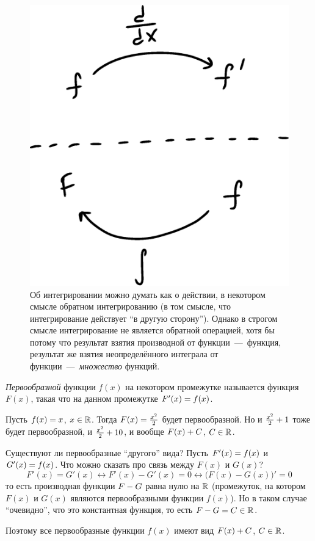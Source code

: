 \documentclass[a4paper,12pt]{article}
\begin{document}
  \begin{figure}[ht]
    \centering
    \includegraphics[width=0.5\linewidth]{images/Diff-Int}
    
    \caption{
      Об интегрировании можно думать как о действии, в некотором смысле обратном интегрированию (в том смысле, что интегрирование действует ``в другую сторону'').
      Однако в строгом смысле интегрирование не является обратной операцией, хотя бы потому что результат взятия производной от функции~---~функция, результат же взятия неопределённого интеграла от функции~---~\emph{множество} функций.
    }  %
    \label{fig:diff-vs-int}
  \end{figure}
  
  \emph{Первообразной} функции $f(x)$ на некотором промежутке называется функция $F(x)$, такая что на данном промежутке $F'(x) \hm= f(x)$.
  
  \begin{example}
    Пусть $f(x) \hm= x$, $x \hm\in \RR$.
    Тогда $F(x) \hm= \frac{x^2}{2}$ будет первообразной.
    Но и $\frac{x^2}{2} \hm+ 1$ тоже будет первообразной, и $\frac{x^2}{2} \hm+ 10$, и вообще $F(x) \hm+ C$, $C \hm\in \RR$.
    
    Существуют ли первообразные ``другого'' вида?
    Пусть $F'(x) \hm= f(x)$ и $G'(x) \hm= f(x)$.
    Что можно сказать про связь между $F(x)$ и $G(x)$?
    \[
      F'(x) = G'(x) \leftrightarrow F'(x) - G'(x) = 0 \leftrightarrow \bigl(F(x) - G(x)\bigr)' = 0
    \]
    то есть производная функции $F \hm- G$ равна нулю на $\operatorname{\mathbb R}$ (промежуток, на котором $F(x)$ и $G(x)$ являются первообразными функции $f(x)$).
    Но в таком случае ``очевидно'', что это константная функция, то есть $F \hm- G \hm= C \hm\in \RR$.
    
    Поэтому все первообразные функции $f(x)$ имеют вид $F(x) \hm+ C$, $C \hm\in \RR$.
  \end{example}
  
\end{document}
